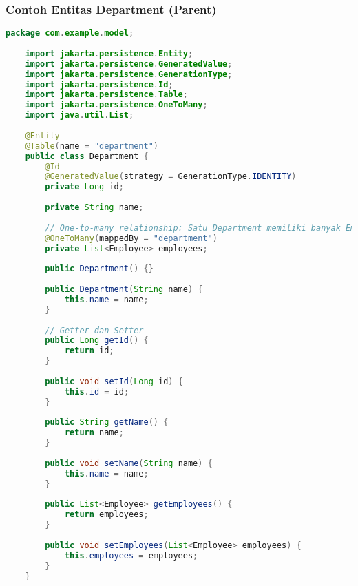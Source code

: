 \subsubsection*{Contoh Entitas Department (Parent)}
\begin{lstlisting}[language=Java, style=JavaStyle]
	package com.example.model;
	
	import jakarta.persistence.Entity;
	import jakarta.persistence.GeneratedValue;
	import jakarta.persistence.GenerationType;
	import jakarta.persistence.Id;
	import jakarta.persistence.Table;
	import jakarta.persistence.OneToMany;
	import java.util.List;
	
	@Entity
	@Table(name = "department")
	public class Department {
		@Id
		@GeneratedValue(strategy = GenerationType.IDENTITY)
		private Long id;
		
		private String name;
		
		// One-to-many relationship: Satu Department memiliki banyak Employee
		@OneToMany(mappedBy = "department")
		private List<Employee> employees;
		
		public Department() {}
		
		public Department(String name) {
			this.name = name;
		}
		
		// Getter dan Setter
		public Long getId() {
			return id;
		}
		
		public void setId(Long id) {
			this.id = id;
		}
		
		public String getName() {
			return name;
		}
		
		public void setName(String name) {
			this.name = name;
		}
		
		public List<Employee> getEmployees() {
			return employees;
		}
		
		public void setEmployees(List<Employee> employees) {
			this.employees = employees;
		}
	}
\end{lstlisting}

